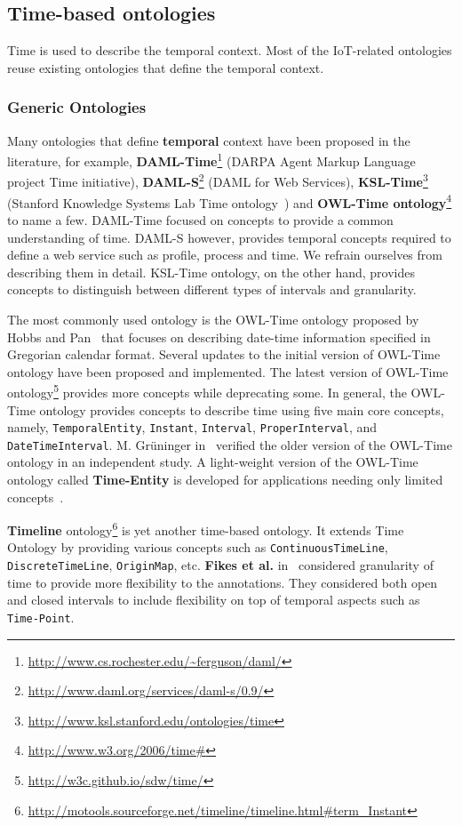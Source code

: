 \documentclass{elsart}  %
\begin{document}
\subsection{Time-based ontologies}
Time is used to describe the temporal context. Most of the IoT-related ontologies reuse existing ontologies that define the temporal context. 
\subsubsection{Generic Ontologies}
Many ontologies that define \textbf{temporal} context have been proposed in the literature, for example, \textbf{DAML-Time}\footnote{\url{http://www.cs.rochester.edu/~ferguson/daml/}} (DARPA Agent Markup Language project Time initiative), \textbf{DAML-S}\footnote{\url{http://www.daml.org/services/daml-s/0.9/}} (DAML for Web Services), \textbf{KSL-Time}\footnote{\url{http://www.ksl.stanford.edu/ontologies/time}} (Stanford Knowledge Systems Lab Time ontology~\cite{Fikes}) and \textbf{OWL-Time ontology}\footnote{\url{http://www.w3.org/2006/time\#}} to name a few. DAML-Time focused on concepts to provide a common understanding of time. DAML-S however, provides temporal concepts required to define a web service such as profile, process and time. We refrain ourselves from describing them in detail. KSL-Time ontology, on the other hand, provides concepts to distinguish between different types of intervals and granularity.

The most commonly used ontology is the OWL-Time ontology proposed by Hobbs and Pan~\cite{hobbsOwlTime2002} that focuses on describing date-time information specified in Gregorian calendar format. Several updates to the initial version of OWL-Time ontology have been proposed and implemented. The latest version of OWL-Time ontology\footnote{\url{http://w3c.github.io/sdw/time/}} provides more concepts while deprecating some. In general, the OWL-Time ontology provides concepts to describe time using five main core concepts, namely, \texttt{TemporalEntity}, \texttt{Instant}, \texttt{Interval}, \texttt{ProperInterval}, and \texttt{DateTimeInterval}. M. Gr\"uninger in~\cite{Gruninger} verified the older version of the OWL-Time ontology in an independent study. A light-weight version of the OWL-Time ontology called \textbf{Time-Entity} is developed for applications needing only limited concepts~\cite{PanTimeEntry}. 

\textbf{Timeline} ontology\footnote{\url{http://motools.sourceforge.net/timeline/timeline.html#term_Instant}} is yet another time-based ontology. It extends Time Ontology by providing various concepts such as \texttt{ContinuousTimeLine}, \texttt{DiscreteTimeLine}, \texttt{OriginMap}, etc. \textbf{Fikes et al.} in~\cite{Fikes} considered granularity of time to provide more flexibility to the annotations. They considered both open and closed intervals to include flexibility on top of temporal aspects such as \texttt{Time-Point}. 
\end{document}
